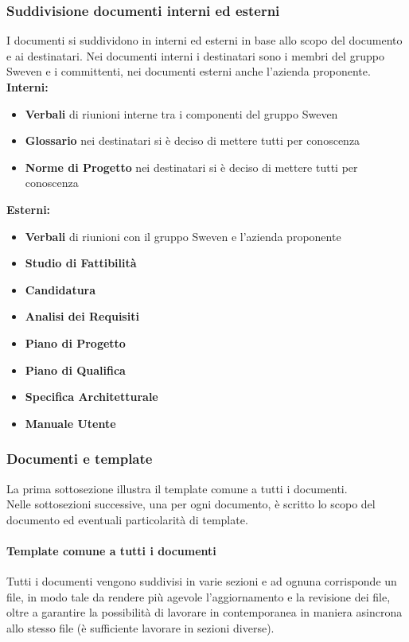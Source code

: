 \subsubsection{Suddivisione documenti interni ed esterni}
I documenti si suddividono in interni ed esterni in base allo scopo del documento e ai destinatari.
Nei documenti interni i destinatari sono i membri del gruppo Sweven e i committenti, nei documenti 
esterni anche l'azienda proponente. \newline
\textbf{Interni:}
\begin{itemize}
    \item \textbf{Verbali} di riunioni interne tra i componenti del gruppo Sweven
    \item \textbf{Glossario} nei destinatari si è deciso di mettere tutti per conoscenza
    \item \textbf{Norme di Progetto} nei destinatari si è deciso di mettere tutti per conoscenza
\end{itemize}

\textbf{Esterni:}
\begin{itemize}
    \item \textbf{Verbali} di riunioni con il gruppo Sweven e l'azienda proponente
    \item \textbf{Studio di Fattibilità}
    \item \textbf{Candidatura}
    \item \textbf{Analisi dei Requisiti}
    \item \textbf{Piano di Progetto}
    \item \textbf{Piano di Qualifica}
    \item \textbf{Specifica Architetturale}
    \item \textbf{Manuale Utente}
\end{itemize}

\subsubsection{Documenti e template}
La prima sottosezione illustra il template comune a tutti i documenti.\\
Nelle sottosezioni successive, una per ogni documento, è scritto lo scopo 
del documento ed eventuali particolarità di template.
\paragraph{Template comune a tutti i documenti} \hfill \break
Tutti i documenti vengono suddivisi in varie sezioni e ad ognuna corrisponde 
un file, in modo tale da rendere più agevole l'aggiornamento e la revisione dei file, 
oltre a garantire la possibilità di lavorare in contemporanea in maniera 
asincrona allo stesso file (è sufficiente lavorare in sezioni diverse).

